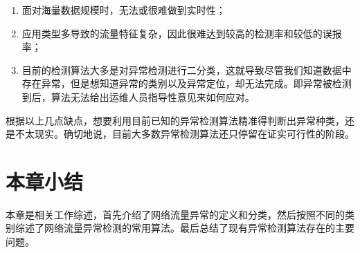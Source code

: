 \begin{enumerate}
  \item 面对海量数据规模时，无法或很难做到实时性；
  \item 应用类型多导致的流量特征复杂，因此很难达到较高的检测率和较低的误报率；
  \item 目前的检测算法大多是对异常检测进行二分类，这就导致尽管我们知道数据中存在异常，但是想知道异常的类别以及异常定位，却无法完成。即异常被检测到后，算法无法给出运维人员指导性意见来如何应对。
\end{enumerate}
根据以上几点缺点，想要利用目前已知的异常检测算法精准得判断出异常种类，还是不太现实。确切地说，目前大多数异常检测算法还只停留在证实可行性的阶段。

\section{本章小结}
本章是相关工作综述，首先介绍了网络流量异常的定义和分类，然后按照不同的类别综述了网络流量异常检测的常用算法。最后总结了现有异常检测算法存在的主要问题。

